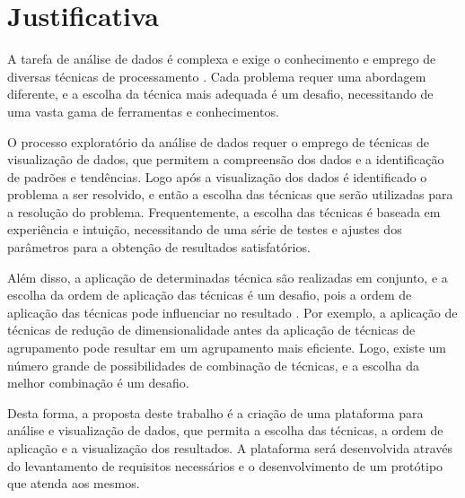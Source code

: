 

\section{Justificativa}
    \label{sec:justificativa}

    A tarefa de análise de dados é complexa e exige o conhecimento e emprego de diversas técnicas de processamento \cite{gomes2005organizaccao}. Cada problema requer uma abordagem diferente, e a escolha da técnica mais adequada é um desafio, necessitando de uma vasta gama de ferramentas e conhecimentos.

    O processo exploratório da análise de dados requer o emprego de técnicas de visualização de dados, que permitem a compreensão dos dados e a identificação de padrões e tendências. Logo após a visualização dos dados é identificado o problema a ser resolvido, e então a escolha das técnicas que serão utilizadas para a resolução do problema. Frequentemente, a escolha das técnicas é baseada em experiência e intuição, necessitando de uma série de testes e ajustes dos parâmetros para a obtenção de resultados satisfatórios.

    Além disso, a aplicação de determinadas técnica são realizadas em conjunto, e a escolha da ordem de aplicação das técnicas é um desafio, pois a ordem de aplicação das técnicas pode influenciar no resultado \cite{gomes2005organizaccao}. Por exemplo, a aplicação de técnicas de redução de dimensionalidade antes da aplicação de técnicas de agrupamento pode resultar em um agrupamento mais eficiente. Logo, existe um número grande de possibilidades de combinação de técnicas, e a escolha da melhor combinação é um desafio.

    Desta forma, a proposta deste trabalho é a criação de uma plataforma para análise e visualização de dados, que permita a escolha das técnicas, a ordem de aplicação e a visualização dos resultados. A plataforma será desenvolvida através do levantamento de requisitos necessários e o desenvolvimento de um protótipo que atenda aos mesmos.
